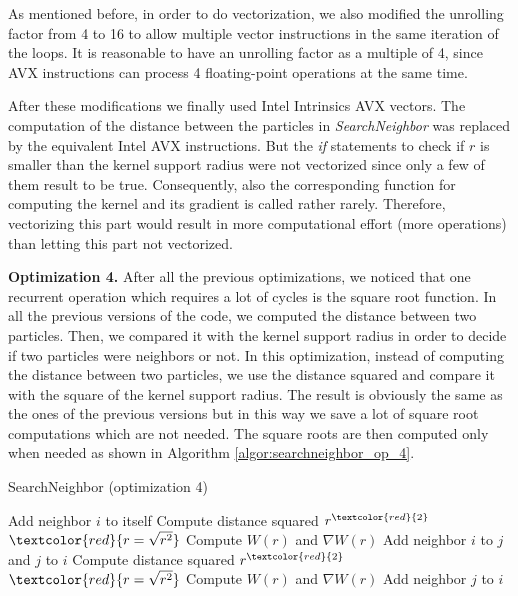 \documentclass[letterpaper]{article}
\newcommand{\mypar}[1]{{\bf #1.}}
\begin{document}
As mentioned before, in order to do vectorization, we also modified the unrolling factor from 4 to 16 to allow multiple vector instructions in the same iteration of the loops. It is reasonable to have an unrolling factor as a multiple of 4, since AVX instructions can process 4 floating-point operations at the same time.

After these modifications we finally used Intel Intrinsics AVX vectors. 
The computation of the distance between the particles in \emph{SearchNeighbor} was replaced by the equivalent Intel AVX instructions. 
But the \emph{if} statements to check if $r$ is smaller than the kernel support radius were not vectorized since only a few of them result to be true. Consequently, also the corresponding function for computing the kernel and its gradient is called rather rarely. Therefore, vectorizing this part would result in more computational effort (more operations) than letting this part not vectorized.

\mypar{Optimization 4}
After all the previous optimizations, we noticed that one recurrent operation which requires a lot of cycles is the square root function. In all the previous versions of the code, we computed the distance between two particles. Then, we compared it with the kernel support radius in order to decide if two particles were neighbors or not. In this optimization, instead of computing the distance between two particles, we use the distance squared and compare it with the square of the kernel support radius. The result is obviously the same as the ones of the previous versions but in this way we save a lot of square root computations which are not needed. The square roots are then computed only when needed as shown in Algorithm \ref{algor:searchneighbor_op_4}.
\begin{algorithm} 
\begin{algorithmic}[1]
\caption{SearchNeighbor (optimization 4)}
\label{algor:searchneighbor_op_4}
    \STATE Add neighbor $i$ to itself
\ENDFOR
{}
        \STATE Compute distance squared $r^{\textcolor{red}{2}}$
            \STATE $\textcolor{red}{r = \sqrt{r^2}}$
            \STATE Compute $W(r)$ and $\nabla W(r)$
            \STATE Add neighbor $i$ to $j$ and $j$ to $i$
        \ENDIF
    \ENDFOR
\ENDFOR
{}
        \STATE Compute distance squared $r^{\textcolor{red}{2}}$
            \STATE $\textcolor{red}{r = \sqrt{r^2}}$
            \STATE Compute $W(r)$ and $\nabla W(r)$
            \STATE Add neighbor $j$ to $i$
        \ENDIF
    \ENDFOR
\ENDFOR
\end{algorithmic}  
\end{algorithm}
\end{document}
